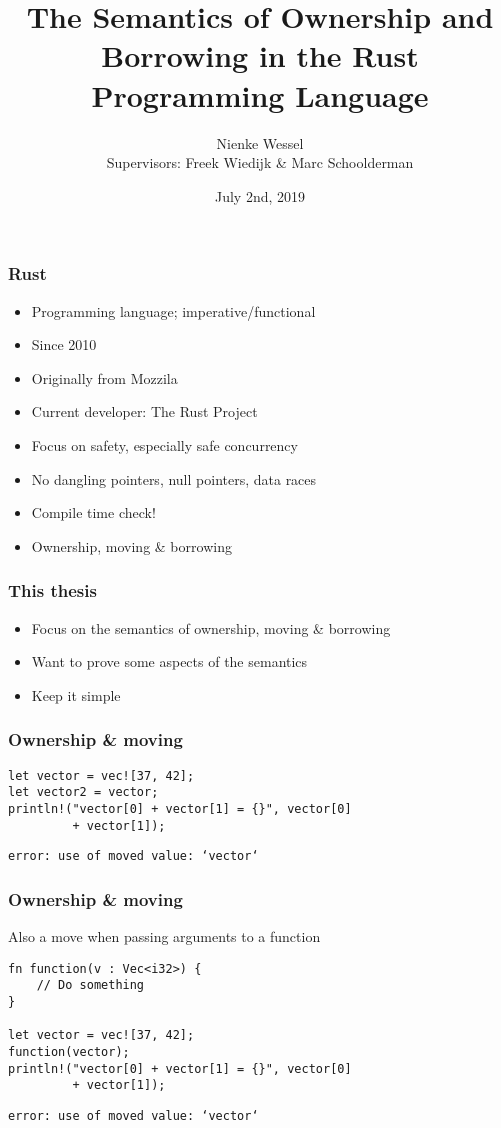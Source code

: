\documentclass{beamer}
\title[Rust Semantics]{The Semantics of Ownership and Borrowing in the Rust Programming Language}
\author[Nienke Wessel]{Nienke Wessel\\
\small Supervisors: Freek Wiedijk \& Marc Schoolderman}
\institute{Radboud University}
\date{July 2nd, 2019}
\begin{document}
 
\frame{\titlepage}




\begin{frame}
\frametitle{Rust}
\begin{itemize}
	\item Programming language; imperative/functional
	\item Since 2010
	\item Originally from Mozzila
	\item Current developer: The Rust Project
\end{itemize}
\pause

\begin{itemize}
	\item Focus on safety, especially safe concurrency
	\item No dangling pointers, null pointers, data races
	\item Compile time check!
	\item Ownership, moving \& borrowing
\end{itemize}
\end{frame}


\begin{frame}
\frametitle{This thesis}
\begin{itemize}
	\item Focus on the semantics of ownership, moving \& borrowing
	\item Want to prove some aspects of the semantics
	\item Keep it simple
\end{itemize}

\end{frame}


\begin{frame}[fragile]
\frametitle{Ownership \& moving}

\begin{lstlisting}
let vector = vec![37, 42];
let vector2 = vector;
println!("vector[0] + vector[1] = {}", vector[0] 
         + vector[1]);
\end{lstlisting}

\texttt{error: use of moved value: `vector`}
\end{frame}


\begin{frame}[fragile]
\frametitle{Ownership \& moving}
Also a move when passing arguments to a function

\begin{lstlisting}
fn function(v : Vec<i32>) {
    // Do something
}

let vector = vec![37, 42];
function(vector);
println!("vector[0] + vector[1] = {}", vector[0] 
         + vector[1]);
\end{lstlisting}

\texttt{error: use of moved value: `vector`}
\end{frame}
\end{document}
